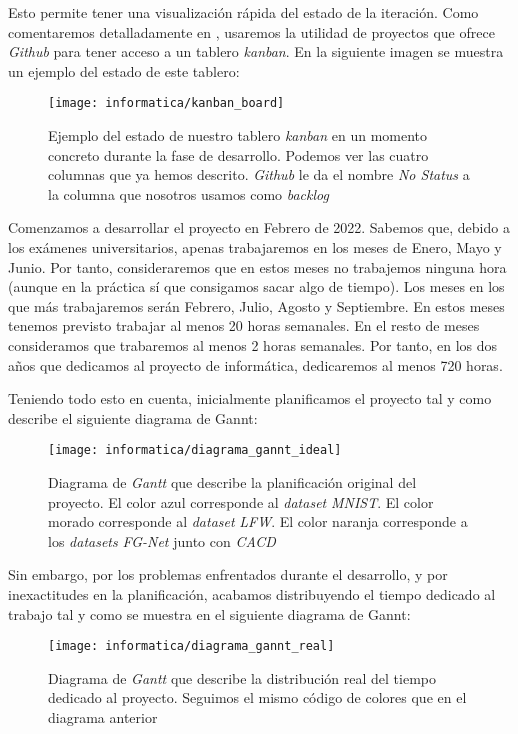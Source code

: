 Esto permite tener una visualización rápida del estado de la iteración. Como comentaremos detalladamente en , usaremos la utilidad de proyectos que ofrece \textit{Github} para tener acceso a un tablero \textit{kanban}. En la siguiente imagen se muestra un ejemplo del estado de este tablero:

\begin{figure}[H]
    \centering
    \texttt{[image: informatica/kanban\_board]}
    \caption{Ejemplo del estado de nuestro tablero \textit{kanban} en un momento concreto durante la fase de desarrollo. Podemos ver las cuatro columnas que ya hemos descrito. \textit{Github} le da el nombre \textit{No Status} a la columna que nosotros usamos como \textit{backlog}}
\end{figure}

Comenzamos a desarrollar el proyecto en Febrero de 2022. Sabemos que, debido a los exámenes universitarios, apenas trabajaremos en los meses de Enero, Mayo y Junio. Por tanto, consideraremos que en estos meses no trabajemos ninguna hora (aunque en la práctica sí que consigamos sacar algo de tiempo). Los meses en los que más trabajaremos serán Febrero, Julio, Agosto y Septiembre. En estos meses tenemos previsto trabajar al menos 20 horas semanales. En el resto de meses consideramos que trabaremos al menos 2 horas semanales. Por tanto, en los dos años que dedicamos al proyecto de informática, dedicaremos al menos 720 horas.

Teniendo todo esto en cuenta, inicialmente planificamos el proyecto tal y como describe el siguiente diagrama de Gannt:

\begin{figure}[H]
    \centering
    \texttt{[image: informatica/diagrama\_gannt\_ideal]}
    \caption{Diagrama de \textit{Gantt} que describe la planificación original del proyecto. El color azul corresponde al \textit{dataset} \textit{MNIST}. El color morado corresponde al \textit{dataset} \textit{LFW}. El color naranja corresponde a los \textit{datasets} \textit{FG-Net} junto con \textit{CACD}}
\end{figure}

Sin embargo, por los problemas enfrentados durante el desarrollo, y por inexactitudes en la planificación, acabamos distribuyendo el tiempo dedicado al trabajo tal y como se muestra en el siguiente diagrama de Gannt:

\begin{figure}[H]
    \centering
    \texttt{[image: informatica/diagrama\_gannt\_real]}
    \caption{Diagrama de \textit{Gantt} que describe la distribución real del tiempo dedicado al proyecto. Seguimos el mismo código de colores que en el diagrama anterior}
    \label{img:gannt_real}
\end{figure}

